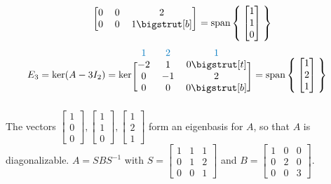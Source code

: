 \documentclass[letterpaper,12pt]{article}
\newcommand{\mat}[1]{
  \begin{bmatrix}
    #1
  \end{bmatrix}
}
\begin{document}
\begin{enumerate}
\begin{align*}
\begin{blockarray}{ccc}
\begin{block}{[ccc]}
          0 & 0 & 2 \\
          0 & 0 & 1 \bigstrut[b] \\
        \end{block}
      \end{blockarray}
      = \text{span}\Set{\mat{1 \\ 1 \\ 0}}
    \end{align*}
    \begin{align*}
      E_3 &= \text{ker}(A - 3I_2)
      = \text{ker} \begin{blockarray}{ccc}
        \color{bookblue}{1} & \color{bookblue}{2} & \color{bookblue}{1} \\
        \begin{block}{[ccc]}
          -2 & 1 & 0 \bigstrut[t] \\
          0 & -1 & 2 \\
          0 & 0 & 0 \bigstrut[b] \\
        \end{block}
      \end{blockarray}
      = \text{span}\Set{\mat{1 \\ 2 \\ 1}}
    \end{align*}
    The vectors $\mat{1 \\ 0 \\ 0}, \mat{1 \\ 1 \\ 0}, \mat{1 \\ 2 \\ 1}$ form an eigenbasis for $A$, so that $A$ is diagonalizable. $A = SBS^{-1}$ with $S = \mat{1 & 1 & 1 \\ 0 & 1 & 2 \\ 0 & 0 & 1}$ and $B = \mat{1 & 0 & 0 \\ 0 & 2 & 0 \\ 0 & 0 & 3}$.

\end{enumerate}
\end{document}
